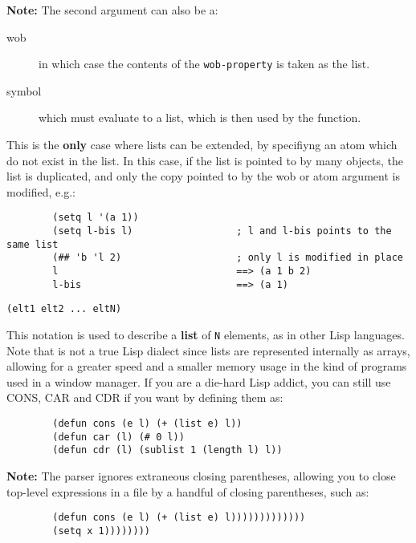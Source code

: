 {\bf Note:} The second argument can also be a:
\begin{description}
\item[wob] in which case the contents of the \verb"wob-property" is taken
as the list.
\item[symbol] which must evaluate to a list, which is then used by the
function.
\end{description}
This is the {\bf only} case where lists can be extended, by specifiyng 
an atom which do not exist in the list. In this case, if the list is pointed
to by many objects, the list is duplicated, and only the copy pointed to by
the wob or atom argument is modified, e.g.:

{\exemplefont\begin{verbatim}
        (setq l '(a 1))
        (setq l-bis l)                  ; l and l-bis points to the same list
        (## 'b 'l 2)                    ; only l is modified in place
        l                               ==> (a 1 b 2)
        l-bis                           ==> (a 1)
\end{verbatim}}


{\usagefont\begin{verbatim}
(elt1 elt2 ... eltN)
\end{verbatim}}\usageupspace

This notation is used to describe a {\bf list} of {\tt N} elements, as in
other Lisp languages. Note that {\WOOL} is not a true Lisp dialect since lists
are represented internally as arrays, allowing for a greater speed and a
smaller memory usage in the kind of programs used in a window manager. If
you are a die-hard Lisp addict, you can still use CONS, CAR and CDR
if you want by defining them as:

{\exemplefont\begin{verbatim}
        (defun cons (e l) (+ (list e) l))
        (defun car (l) (# 0 l))
        (defun cdr (l) (sublist 1 (length l) l))
\end{verbatim}}

{\bf Note:} The {\WOOL} parser ignores extraneous closing parentheses,
allowing you to close top-level expressions in a file by a handful of
closing parentheses, such as:

{\exemplefont\begin{verbatim}
        (defun cons (e l) (+ (list e) l)))))))))))))
        (setq x 1))))))))
\end{verbatim}}

